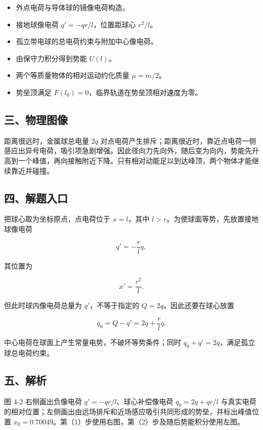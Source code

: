 \documentclass[12pt,a4paper,UTF8]{ctexart}
\newcommand{\tightlist}{\setlength{\itemsep}{0pt}\setlength{\parskip}{0pt}}
\begin{document}
\begin{itemize}
\tightlist
\item
  外点电荷与导体球的镜像电荷构造。
\item
  接地球像电荷 \(q'=-qr/l\)，位置距球心 \(r^2/l\)。
\item
  孤立带电球的总电荷约束与附加中心像电荷。
\item
  由保守力积分得到势能 \(U(l)\)。
\item
  两个等质量物体的相对运动约化质量 \(\mu=m/2\)。
\item
  势垒顶满足 \(F(l_0)=0\)，临界轨道在势垒顶相对速度为零。
\end{itemize}

\subsection{三、物理图像}\label{ux4e09ux7269ux7406ux56feux50cf-3}

距离很远时，金属球总电量 \(2q\)
对点电荷产生排斥；距离很近时，靠近点电荷一侧感应出异号电荷，吸引项急剧增强。因此径向力先向外，随后变为向内，势能先升高到一个峰值，再向接触附近下降。只有相对动能足以到达峰顶，两个物体才能继续靠近并碰撞。

\subsection{四、解题入口}\label{ux56dbux89e3ux9898ux5165ux53e3-3}

把球心取为坐标原点，点电荷位于 \(x=l\)，其中
\(l>r\)。为使球面等势，先放置接地球像电荷

\[q'=-\frac rl q,\]

其位置为

\[x'=\frac{r^2}{l}.\]

但此时球内像电荷总量为 \(q'\)，不等于指定的 \(Q=2q\)。因此还要在球心放置

\[q_0=Q-q'=2q+\frac rl q.\]

中心电荷在球面上产生常量电势，不破坏等势条件；同时
\(q_0+q'=2q\)，满足孤立球总电荷约束。

\subsection{五、解析}\label{ux4e94ux89e3ux6790-3}

图 4-2 右侧画出负像电荷 \(q'=-qr/l\)、球心补偿像电荷 \(q_0=2q+qr/l\)
与真实电荷的相对位置；左侧画出由远场排斥和近场感应吸引共同形成的势垒，并标出峰值位置
\(x_0=0.70049\)。第（1）步使用右图，第（2）步及随后势能积分使用左图。
\end{document}
